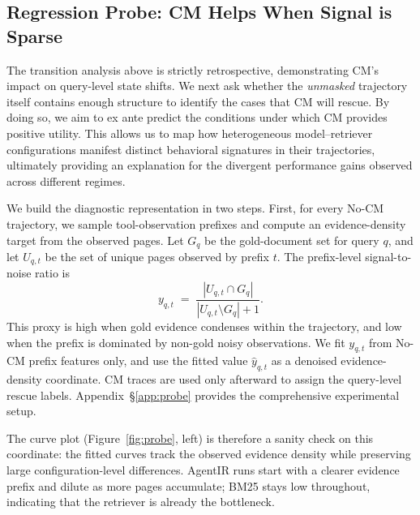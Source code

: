 \subsection{Regression Probe: CM Helps When Signal is Sparse}
\label{exp:regression-probe}

The transition analysis above is strictly retrospective, demonstrating CM's impact on query-level state shifts. We next ask whether the \emph{unmasked} trajectory itself contains enough structure to identify the cases that CM will rescue. By doing so, we aim to ex ante predict the conditions under which CM provides positive utility. This allows us to map how heterogeneous model--retriever configurations manifest distinct behavioral signatures in their trajectories, ultimately providing an explanation for the divergent performance gains observed across different regimes.

We build the diagnostic representation in two steps. First, for every No-CM trajectory, we sample tool-observation prefixes and compute an evidence-density
target from the observed pages. Let $G_q$ be the gold-document set for query $q$, and let $U_{q,t}$ be the set of unique pages observed by prefix $t$. The prefix-level signal-to-noise ratio is
\[
    y_{q,t}
    \;=\;
    \frac{|U_{q,t} \cap G_q|}
         {|U_{q,t} \setminus G_q| + 1}.
\]
This proxy is high when gold evidence condenses within the trajectory, and low when the prefix is dominated by non-gold noisy observations. We fit $y_{q,t}$ from No-CM prefix features only, and use the fitted value $\widehat{y}_{q,t}$ as a denoised evidence-density coordinate. CM traces are used only afterward to assign the query-level rescue labels. Appendix~\S\ref{app:probe} provides the comprehensive experimental setup.

The curve plot (Figure~\ref{fig:probe}, left) is therefore a sanity check on this coordinate: the fitted curves track the observed evidence density while preserving large configuration-level differences. AgentIR runs start with a clearer evidence prefix and dilute as more pages accumulate; BM25 stays low throughout, indicating that the retriever is already the bottleneck.

